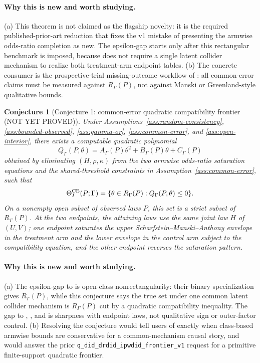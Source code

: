 \documentclass[11pt]{article}
\theoremstyle{definition}
\theoremstyle{plain}
\newtheorem{conjecture}{Conjecture}
\theoremstyle{remark}
\begin{document}
\paragraph{Why this is new and worth studying.}
(a) This theorem is not claimed as the flagship novelty: it is the required published-prior-art reduction that fixes the v1 mistake of presenting the armwise odds-ratio completion as new.  The epsilon-gap starts only after this rectangular benchmark is imposed, because \citet{ScharfsteinManskiAnthony2004Bounds} does not require a single latent collider mechanism to realize both treatment-arm endpoint tables.  (b) The concrete consumer is the prospective-trial missing-outcome workflow of \citet{ScharfsteinManskiAnthony2004Bounds}: all common-error claims must be measured against \(R_\Gamma(P)\), not against Manski or Greenland-style qualitative bounds.

\begin{conjecture}[Conjecture 1: common-error quadratic compatibility frontier (NOT YET PROVED)]\label{conj:common-frontier}
Under Assumptions~\ref{ass:random-consistency}, \ref{ass:bounded-observed}, \ref{ass:gamma-or}, \ref{ass:common-error}, and \ref{ass:open-interior}, there exists a computable quadratic polynomial
\[
  Q_\Gamma(P,\theta)=A_\Gamma(P)\theta^2+B_\Gamma(P)\theta+C_\Gamma(P)
\]
obtained by eliminating \((H,\rho,\kappa)\) from the two armwise odds-ratio saturation equations and the shared-threshold constraints in Assumption~\ref{ass:common-error}, such that
\[
  \Theta_I^{\rm CE}(P;\Gamma)
  =\{\theta\in R_\Gamma(P): Q_\Gamma(P,\theta)\le 0\}.
\]
On a nonempty open subset of observed laws \(P\), this set is a strict subset of \(R_\Gamma(P)\).  At the two endpoints, the attaining laws use the same joint law \(H\) of \((U,V)\); one endpoint saturates the upper Scharfstein--Manski--Anthony envelope in the treatment arm and the lower envelope in the control arm subject to the compatibility equation, and the other endpoint reverses the saturation pattern.
\end{conjecture}

\paragraph{Why this is new and worth studying.}
(a) The epsilon-gap to \citet{ScharfsteinManskiAnthony2004Bounds} is open-class nonrectangularity: their binary specialization gives \(R_\Gamma(P)\), while this conjecture says the true set under one common latent collider mechanism is \(R_\Gamma(P)\) cut by a quadratic compatibility inequality.  The gap to \citet{Greenland2003ColliderBias}, \citet{VanderWeeleRobins2009MonotonicEffects}, and \citet{SmithVanderWeele2019Selection} is sharpness with endpoint laws, not qualitative sign or outer-factor control.  (b) Resolving the conjecture would tell users of \citet{ScharfsteinManskiAnthony2004Bounds} exactly when class-based armwise bounds are conservative for a common-mechanism causal story, and would answer the prior \texttt{q\_did\_drdid\_ipwdid\_frontier\_v1} request for a primitive finite-support quadratic frontier.
\end{document}
